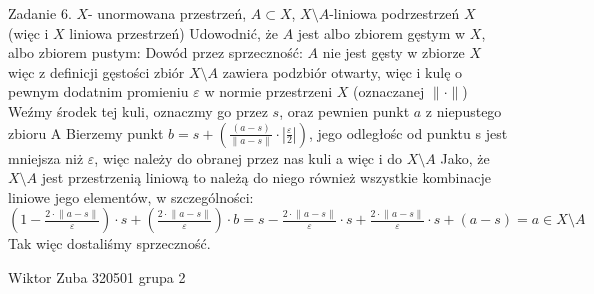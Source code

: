 \documentclass{article}
\begin{document}
Zadanie 6.
\newline
\newline
$X$- unormowana przestrzeń, $A\subset X$, $X\setminus A$-liniowa podrzestrzeń $X$ (więc i $X$ liniowa przestrzeń)\newline
Udowodnić, że $A$ jest albo zbiorem gęstym w $X$, albo zbiorem pustym:\newline
Dowód przez sprzeczność: $A$ nie jest gęsty w zbiorze $X$ więc z definicji gęstości zbiór $X\setminus A$ zawiera podzbiór otwarty,
więc i kulę o pewnym dodatnim promieniu $\varepsilon$ w normie przestrzeni $X$ (oznaczanej $\lVert\cdot\rVert$)\newline
Weźmy środek tej kuli, oznaczmy go przez $s$, oraz pewnien punkt $a$ z niepustego zbioru A\newline
Bierzemy punkt $b=s+\left(\frac{(a-s)}{\lVert a-s\rVert}\cdot|\frac{\varepsilon}{2}|\right)$, jego odległośc od punktu s jest mniejsza niż $\varepsilon$, więc należy
do obranej przez nas kuli a więc i do $X\setminus A$\newline
Jako, że $X\setminus A$ jest przestrzenią liniową to należą do niego również wszystkie kombinacje liniowe jego elementów, w szczególności:\newline
$\left(1-\frac{2\cdot\lVert a-s\rVert}{\varepsilon}\right)\cdot s+\left(\frac{2\cdot\lVert a-s\rVert}{\varepsilon}\right)\cdot b=
s-\frac{2\cdot\lVert a-s\rVert}{\varepsilon}\cdot s+\frac{2\cdot\lVert a-s\rVert}{\varepsilon}\cdot s+(a-s)=a\in X\setminus A$\newline
Tak więc dostaliśmy sprzeczność.\newpage

Wiktor Zuba 320501 grupa 2
\newline
\end{document}
